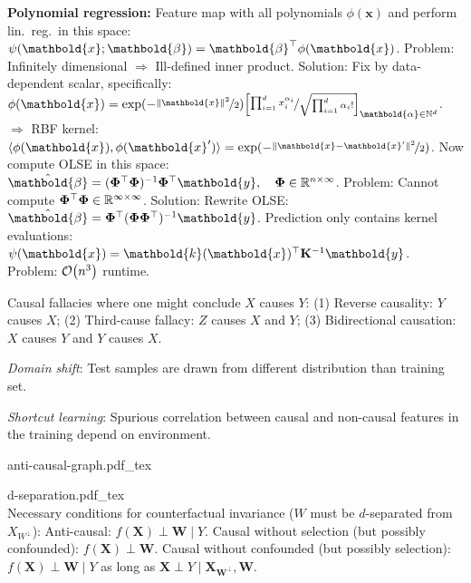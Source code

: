 \documentclass[9pt]{extarticle}
\newcommand{\incfig}[1]{
    \def\svgwidth{\columnwidth}
    {#1.pdf_tex}
}
\newenvironment{topic}[1]
{\textbf{\sffamily \colorbox{black}{\rlap{\textbf{\textcolor{white}{#1}}}\hspace{\linewidth}\hspace{-2\fboxsep}}}}
{}
\newenvironment{subtopic}[1]
{\textbf{\sffamily #1:}}
{}
\renewcommand{\mat}[1]{\ensuremath{\mathbf{#1}}}
\renewcommand{\vec}[1]{\ensuremath{\mathbold{#1}}}
\begin{document}
\begin{multicols*}{3}
\begin{topic}{Regression}
        \begin{subtopic}{Polynomial regression}
            Feature map with all polynomials $\phi(\vec{x})$ and perform lin.\ reg.\ in this space: $\psi(\vec{x}; \vec{\beta}) = \transpose{\vec{\beta}} \phi(\vec{x})$.
            Problem: Infinitely dimensional $\Rightarrow$ Ill-defined inner product. Solution: Fix by
            data-dependent scalar, specifically: $\phi(\vec{x}) = \exp(-\nicefrac{\| \vec{x} \|^2}{2}) \lft[ \nicefrac{\prod_{i=1}^d x_i^{\alpha_i}}{\sqrt{\prod_{i=1}^d \alpha_i!}} \rgt]_{\vec{\alpha} \in \mathbb{N}^d}$. \\
            $\Rightarrow$ RBF kernel: $\langle \phi(\vec{x}), \phi(\vec{x}') \rangle = \exp (
                -\nicefrac{\| \vec{x} - \vec{x}' \|^2}{2} )$. Now compute OLSE in this space: $\hat{\vec{\beta}} =
                \inv{(\transpose{\mat{\Phi}} \mat{\Phi})} \transpose{\mat{\Phi}} \vec{y}, \quad \mat{\Phi} \in
                \R^{n \times \infty}$. Problem: Cannot compute $\transpose{\mat{\Phi}} \mat{\Phi} \in \R^{\infty
                    \times \infty}$. Solution: Rewrite OLSE: $\hat{\vec{\beta}} = \transpose{\mat{\Phi}}
                \inv{(\mat{\Phi} \transpose{\mat{\Phi}})} \vec{y}$. Prediction only contains kernel evaluations:
            $\psi(\vec{x}) = \transpose{\vec{k}(\vec{x})} \inv{\mat{K}} \vec{y}$. Problem: $\bigo{n^3}$
            runtime.

        \end{subtopic}

    \end{topic}

    \begin{topic}{Causality}
        Causal fallacies where one might conclude $X$ causes $Y$: (1) Reverse causality: $Y$ causes $X$;
        (2) Third-cause fallacy: $Z$ causes $X$ and $Y$; (3) Bidirectional causation: $X$ causes $Y$ and
        $Y$ causes $X$.

        \textit{Domain shift}: Test samples are drawn from different distribution than training set.

        \textit{Shortcut learning}: Spurious correlation between causal and non-causal features in the training
        depend on environment.

        \incfig{anti-causal-graph} \incfig{d-separation} \\
        Necessary conditions for counterfactual invariance ($W$ must be $d$-separated from $X_{W^\perp}$):
        Anti-causal: $f(\mat{X}) \perp \mat{W} \mid Y$. Causal without selection (but possibly confounded):
        $f(\mat{X}) \perp \mat{W}$. Causal without confounded (but possibly selection): $f(\mat{X}) \perp
            \mat{W} \mid Y$ as long as $\mat{X} \perp Y \mid \mat{X}_{\mat{W}^{\perp}}, \mat{W}$.


\end{topic}
\end{multicols*}
\end{document}
